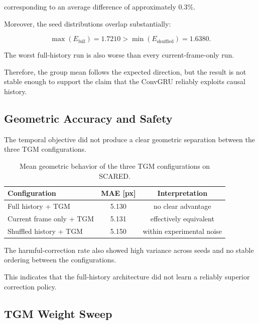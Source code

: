 \documentclass[11pt,a4paper]{article}
\begin{document}
corresponding to an average difference of approximately $0.3\%$.

Moreover, the seed distributions overlap substantially:

\begin{equation}
\max
\left(
E_{\mathrm{full}}
\right)
=
1.7210
>
\min
\left(
E_{\mathrm{shuffled}}
\right)
=
1.6380.
\end{equation}

The worst full-history run is also worse than every current-frame-only run.

Therefore, the group mean follows the expected direction, but the result is not
stable enough to support the claim that the ConvGRU reliably exploits causal history.

\subsection{Geometric Accuracy and Safety}

The temporal objective did not produce a clear geometric separation between the
three TGM configurations.

\begin{table}[h]
\centering
\caption{Mean geometric behavior of the three TGM configurations on SCARED.}
\small
\begin{tabular}{lcc}
\toprule
\textbf{Configuration}
& \textbf{MAE [px]}
& \textbf{Interpretation} \\
\midrule
Full history + TGM
& 5.130
& no clear advantage \\

Current frame only + TGM
& 5.131
& effectively equivalent \\

Shuffled history + TGM
& 5.150
& within experimental noise \\
\bottomrule
\end{tabular}
\end{table}

The harmful-correction rate also showed high variance across seeds and no stable
ordering between the configurations.

This indicates that the full-history architecture did not learn a reliably superior
correction policy.

\subsection{TGM Weight Sweep}
\end{document}

